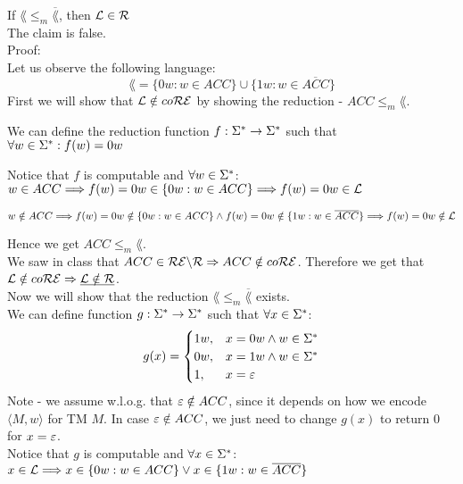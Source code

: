 If $\lang \leq_m \overline{\lang}$, then $\mathcal{L} \in \mathcal{R}$ \\
The claim is false. \\

Proof: \\
Let us observe the following language:
\[
    \lang = \{0w: w \in ACC\} \cup \{1w: w \in \overline{ACC}\}
\]
First we will show that $\mathcal{L} \notin co\mathcal{R}\mathcal{E}$ by showing the reduction - $ACC \leq_m \lang$.

We can define the reduction function $f: \Sigma^* \rightarrow \Sigma^*$ such that $\forall w \in \Sigma^*: f(w) = 0w$

Notice that $f$ is computable and $\forall w \in \Sigma^*$: \\
$w \in ACC \\
    \Longrightarrow f(w) = 0w \in \{0w: w \in ACC\} \\
    \Longrightarrow f(w) = 0w \in \mathcal{L}$

$w \notin ACC \\
    \Longrightarrow f(w) = 0w \notin \{0w: w \in ACC\} \wedge f(w) = 0w \notin \{1w: w \in \overline{ACC}\} \\
    \Longrightarrow f(w) = 0w \notin \mathcal{L}$

Hence we get $ACC \leq_m \lang$. \\
We saw in class that $ACC \in \mathcal{R}\mathcal{E} \backslash \mathcal{R} \Rightarrow ACC \notin co\mathcal{R}\mathcal{E}$.
Therefore we get that $\mathcal{L} \notin co\mathcal{R}\mathcal{E} \Rightarrow \underline{\mathcal{L} \notin \mathcal{R}}$. \\

Now we will show that the reduction $\lang \leq_m \overline{\lang}$ exists. \\
We can define function $g: \Sigma^* \rightarrow \Sigma^*$ such that $\forall x \in \Sigma^*$:
\[
    g(x) =
    \begin{cases}
        1w, & x = 0w \wedge w \in \Sigma^* \\
        0w, & x = 1w \wedge w \in \Sigma^* \\
        1,  & x = \varepsilon                 \\
    \end{cases}
\]
Note - we assume w.l.o.g. that $\varepsilon \notin ACC$, since it depends on
how we encode $\langle M, w \rangle$ for TM $M$.
In case $\varepsilon \notin ACC$, we just need to change $g(x)$ to return $0$ for $x = \varepsilon$. \\

Notice that $g$ is computable and $\forall x \in \Sigma^*$: \\
$x \in \mathcal{L} \\
    \Longrightarrow x \in \{0w: w \in ACC\} \vee x \in \{1w: w \in \overline{ACC}\}$

